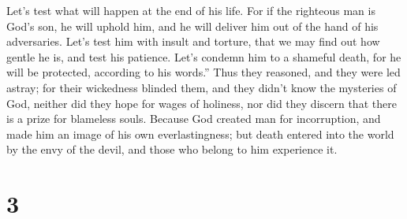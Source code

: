 Let's test what will happen at the end of his life.  For if
the righteous man is God's son, he will uphold him, and he will deliver
him out of the hand of his adversaries.  Let's test him
with insult and torture, that we may find out how gentle he is, and test
his patience.  Let's condemn him to a shameful death, for
he will be protected, according to his words.''  Thus they
reasoned, and they were led astray; for their wickedness blinded them,
 and they didn't know the mysteries of God, neither did
they hope for wages of holiness, nor did they discern that there is a
prize for blameless souls.  Because God created man for
incorruption, and made him an image of his own everlastingness;
 but death entered into the world by the envy of the devil,
and those who belong to him experience it.

\hypertarget{section-2}{%
\section{3}\label{section-2}}

